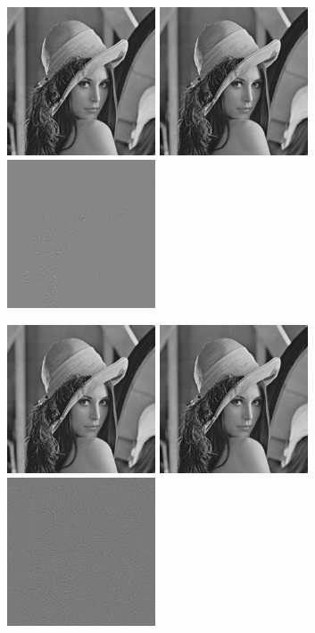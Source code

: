 \documentclass{article}
\begin{document}
\includegraphics[width=0.33\textwidth]{../data/lenna.jpg}
\includegraphics[width=0.33\textwidth]{../data/threshold_16_lenna.jpg}
\includegraphics[width=0.33\textwidth]{../data/delta_threshold_16_lenna.jpg}

\includegraphics[width=0.33\textwidth]{../data/lenna.jpg}
\includegraphics[width=0.33\textwidth]{../data/threshold_32_lenna.jpg}
\includegraphics[width=0.33\textwidth]{../data/delta_threshold_32_lenna.jpg}
\end{document}
